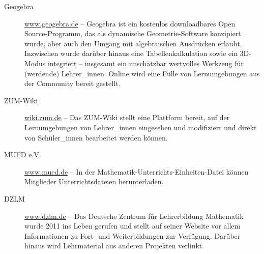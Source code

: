 \documentclass[ngerman,oneside,12pt,a4paper]{scrbook}
\begin{document}
\begin{description}
\item[Geogebra]
\href{https://www.geogebra.org}{www.geogebra.de} -- Geogebra ist ein
kostenlos downloadbares Open Source-Programm, das als dynamische
Geometrie-Software konzipiert wurde, aber auch den Umgang mit
algebraischen Ausdrücken erlaubt. Inzwischen wurde darüber hinaus eine
Tabellenkalkulation sowie ein 3D-Modus integriert -- insgesamt ein
unschätzbar wertvolles Werkzeug für (werdende) Lehrer\_innen. Online
wird eine Fülle von Lernumgebungen aus der Community bereit gestellt.
\item[ZUM-Wiki]
\href{https://wiki.zum.de}{wiki.zum.de} -- Das ZUM-Wiki stellt eine
Plattform bereit, auf der Lernumgebungen von Lehrer\_innen eingesehen
und modifiziert und direkt von Schüler\_innen bearbeitet werden können.
\item[MUED e.V.]
\href{https://www.mued.de}{www.mued.de} -- In der
Mathematik-Unterrichts-Einheiten-Datei können Mitglieder
Unterrichtsdateien herunterladen.
\item[DZLM]
\href{https://www.dzlm.de}{www.dzlm.de} -- Das Deutsche Zentrum für
Lehrerbildung Mathematik wurde 2011 ins Leben gerufen und stellt auf
seiner Website vor allem Informationen zu Fort- und Weiterbildungen zur
Verfügung. Darüber hinaus wird Lehrmaterial aus anderen Projekten
verlinkt.
\end{description}

\printbibliography
\end{document}
